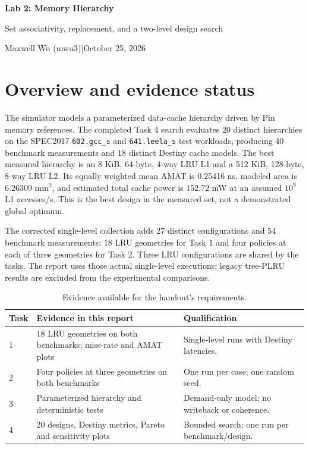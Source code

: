 \documentclass[10pt,letterpaper]{article}
\begin{document}
\begin{center}
{\LARGE\bfseries Lab 2: Memory Hierarchy}\par\vspace{5pt}
{\large Set associativity, replacement, and a two-level design search}\par
Maxwell Wu (mwu3)\quad |\quad October 25, 2026
\end{center}
\section*{Overview and evidence status}
The simulator models a parameterized data-cache hierarchy driven by Pin memory
references. The completed Task 4 search evaluates 20 distinct hierarchies on the
SPEC2017 \texttt{602.gcc\_s} and \texttt{641.leela\_s} test workloads, producing 40
benchmark measurements and 18 distinct Destiny cache models. The best measured
hierarchy is an 8 KiB, 64-byte, 4-way LRU L1 and a 512 KiB, 128-byte, 8-way LRU L2.
Its equally weighted mean AMAT is 0.25416 ns, modeled area is 6.26309 mm$^2$, and
estimated total cache power is 152.72 mW at an assumed $10^9$ L1 accesses/s.
This is the best design in the measured set, not a demonstrated global optimum.

The corrected single-level collection adds 27 distinct configurations and 54
benchmark measurements: 18 LRU geometries for Task 1 and four policies at each
of three geometries for Task 2. Three LRU configurations are shared by the tasks.
The report uses those actual single-level executions; legacy tree-PLRU results
are excluded from the experimental comparisons.

\begin{table}[H]\centering\small
\caption{Evidence available for the handout's requirements.}
\begin{tabular}{p{.10\linewidth}p{.43\linewidth}p{.36\linewidth}}\toprule
Task & Evidence in this report & Qualification \\\midrule
1 & 18 LRU geometries on both benchmarks; miss-rate and AMAT plots & Single-level runs with Destiny latencies. \\
2 & Four policies at three geometries on both benchmarks & One run per case; one random seed. \\
3 & Parameterized hierarchy and deterministic tests & Demand-only model; no writeback or coherence. \\
4 & 20 designs, Destiny metrics, Pareto and sensitivity plots & Bounded search; one run per benchmark/design. \\\bottomrule
\end{tabular}\end{table}
\end{document}
